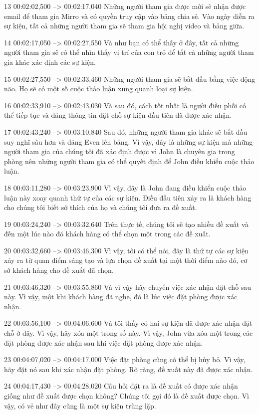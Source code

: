 13
00:02:02,500 --> 00:02:17,040
Những người tham gia được mời sẽ nhận được email để tham gia Mirro và có quyền truy cập vào bảng chia sẻ.  Vào ngày diễn ra sự kiện, tất cả những người tham gia sẽ tham gia hội nghị video và bảng giữa.

14
00:02:17,050 --> 00:02:27,550
Và như bạn có thể thấy ở đây, tất cả những người tham gia sẽ có thể nhìn thấy vị trí của con trỏ để tất cả những người tham gia khác xác định các sự kiện.

15
00:02:27,550 --> 00:02:33,460
Những người tham gia sẽ bắt đầu bằng việc động não.  Họ sẽ có một số cuộc thảo luận xung quanh loại sự kiện.

16
00:02:33,910 --> 00:02:43,030
Và sau đó, cách tốt nhất là người điều phối có thể tiếp tục và đăng thông tin đặt chỗ sự kiện đầu tiên đã được xác nhận.

17
00:02:43,240 --> 00:03:10,840
Sau đó, những người tham gia khác sẽ bắt đầu suy nghĩ sâu hơn và đăng Even lên bảng.  Vì vậy, đây là những sự kiện mà những người tham gia của chúng tôi đã xác định được vì John là chuyên gia trong phòng nên những người tham gia có thể quyết định để John điều khiển cuộc thảo luận.

18
00:03:11,280 --> 00:03:23,900
Vì vậy, đây là John đang điều khiển cuộc thảo luận này xoay quanh thứ tự của các sự kiện.  Điều đầu tiên xảy ra là khách hàng cho chúng tôi biết sở thích của họ và chúng tôi đưa ra đề xuất.

19
00:03:24,240 --> 00:03:32,640
Trên thực tế, chúng tôi sẽ tạo nhiều đề xuất và đến một lúc nào đó khách hàng có thể chọn một trong các đề xuất.

20
00:03:32,660 --> 00:03:46,300
Vì vậy, tôi có thể nói, đây là thứ tự các sự kiện xảy ra từ quan điểm sáng tạo và lựa chọn đề xuất tại một thời điểm nào đó, cơ sở khách hàng cho đề xuất đã chọn.

21
00:03:46,320 --> 00:03:55,860
Và vì vậy hãy chuyển việc xác nhận đặt chỗ sau này.  Vì vậy, một khi khách hàng đã nghe, đó là lúc việc đặt phòng được xác nhận.

22
00:03:56,100 --> 00:04:06,600
Và tôi thấy có hai sự kiện đã được xác nhận đặt chỗ ở đây.  Vì vậy, hãy xóa một trong số này.  Vì vậy, John vừa xóa một trong các đặt phòng được xác nhận sau khi việc đặt phòng được xác nhận.

23
00:04:07,020 --> 00:04:17,000
Việc đặt phòng cũng có thể bị hủy bỏ.  Vì vậy, hãy đặt nó sau khi xác nhận đặt phòng.  Rõ ràng, đề xuất này đã được xác nhận.

24
00:04:17,430 --> 00:04:28,020
Câu hỏi đặt ra là đề xuất có được xác nhận giống như đề xuất được chọn không?  Chúng tôi gọi đó là đề xuất được chọn.  Vì vậy, có vẻ như đây cũng là một sự kiện trùng lặp.

